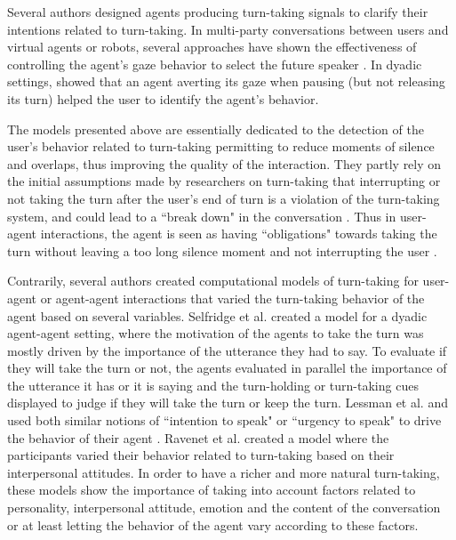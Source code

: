 
Several authors designed agents producing turn-taking signals to clarify their intentions related to turn-taking. In multi-party conversations between users and virtual agents or robots, several approaches have shown the effectiveness of controlling the agent's gaze behavior to select the future speaker \citep{mutlu_storytelling_2006,bohus_facilitating_2010,al_moubayed_regulating_2015}. In dyadic settings, \citep{skantze_turn-taking_2014} showed that an agent averting its gaze when pausing (but not releasing its turn) helped the user to identify the agent's behavior.

The models presented above are essentially dedicated to the detection of the user's behavior related to turn-taking permitting
to reduce moments of silence and overlaps, thus improving the quality of the interaction. They partly rely on the initial assumptions made by researchers on
turn-taking that interrupting or not taking
the turn after the user's end of turn is a violation
of the turn-taking system, and could lead to a ``break
down" in the conversation \citep{cutler_analysis_1986}. Thus in user-agent interactions,
the agent is seen as having ``obligations" towards
taking the turn without leaving a too long silence
moment and not interrupting the user \citep{de_kok_multimodal_2009}.

Contrarily, several authors created computational models of
turn-taking for user-agent or agent-agent interactions
that varied the turn-taking behavior of the agent based
on several variables. Selfridge et al. \citep{selfridge_bidding_2009} created a model for a dyadic
agent-agent setting, where the motivation of the agents
to take the turn was mostly driven by the importance
of the utterance they had to say. To evaluate if they
will take the turn or not, the agents evaluated in parallel
the importance of the utterance it has or it is saying
and the turn-holding or turn-taking cues displayed to
judge if they will take the turn or keep the turn. Lessman et al. \citep{lessmann_towards_2004}and \citep{thorisson_multiparty_2010}
used both similar notions of ``intention to speak" \citep{lessmann_towards_2004} or
``urgency to speak" to drive the behavior of their agent
\citep{thorisson_multiparty_2010}. Ravenet et al. \citep{ravenet_conversational_2015} created a model where the participants varied
their behavior related to turn-taking based on their interpersonal
attitudes. In order to have a richer and more
natural turn-taking, these models show the importance
of taking into account factors related to personality,
interpersonal attitude, emotion and the content of the
conversation or at least letting the behavior of the agent
vary according to these factors.

